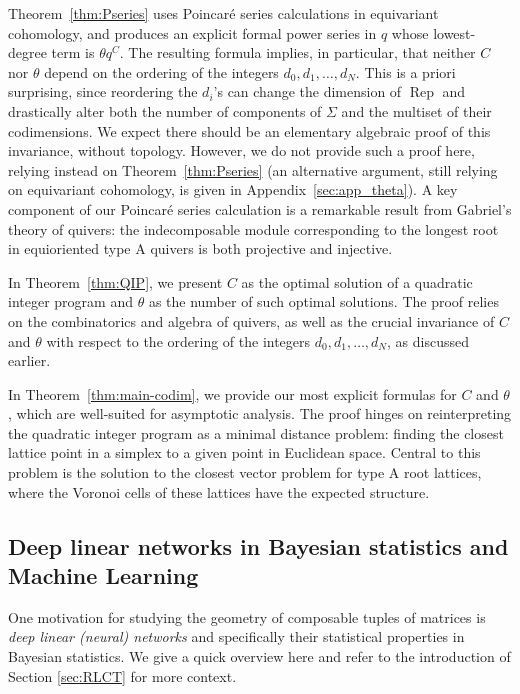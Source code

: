 \documentclass[a4paper]{amsart}
\DeclareMathOperator{\Rep}{\mathrm{Rep}}
\newcommand{\codimnot}{C}
\theoremstyle{plain}
\begin{document}
Theorem~\ref{thm:Pseries} uses Poincar\'e series calculations in equivariant cohomology, and produces an explicit formal power series in $q$ whose lowest-degree term is $\theta q^\codimnot$. The resulting formula implies, in particular, that neither $\codimnot$ nor $\theta$ depend on the ordering of the integers $d_0,d_1,\ldots,d_N$. This is a priori surprising, since reordering the $d_i$'s can change the dimension of $\Rep$ and drastically alter both the number of components of $\Sigma$ and the multiset of their codimensions. We expect there should be an elementary algebraic proof of this invariance, without topology. However, we do not provide such a proof here, relying instead on Theorem~\ref{thm:Pseries} (an alternative argument, still relying on equivariant cohomology, is given in Appendix~\ref{sec:app_theta}). A key component of our Poincar\'e series calculation is a remarkable result from Gabriel's theory of quivers: the indecomposable module corresponding to the longest root in equioriented type A quivers is both projective and injective.

In Theorem~\ref{thm:QIP}, we present $\codimnot$ as the optimal solution of a quadratic integer program and $\theta$ as the number of such optimal solutions. The proof relies on the combinatorics and algebra of quivers, as well as the crucial invariance of $\codimnot$ and $\theta$ with respect to the ordering of the integers $d_0,d_1,\ldots,d_N$, as discussed earlier.

In Theorem~\ref{thm:main-codim}, we provide our most explicit formulas for $\codimnot$ and $\theta$, which are well-suited for asymptotic analysis. The proof hinges on reinterpreting the quadratic integer program as a minimal distance problem: finding the closest lattice point in a simplex to a given point in Euclidean space. Central to this problem is the solution to the closest vector problem for type A root lattices, where the Voronoi cells of these lattices have the expected structure.

\subsection{Deep linear networks in Bayesian statistics and Machine Learning}\label{sec:DLN_intro}

One motivation for studying the geometry of composable tuples of matrices is \emph{deep linear (neural) networks} and specifically their statistical properties in Bayesian statistics. We give a quick overview here and refer to the introduction of Section \ref{sec:RLCT} for more context.
\end{document}
